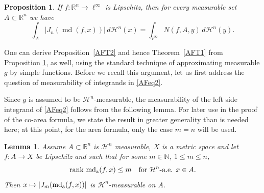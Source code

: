 \documentclass[12pt,leqno]{amsart}
\newtheorem{lemma}[theorem]{Lemma}
\newtheorem{proposition}[theorem]{Proposition}
\theoremstyle{definition}
\newcommand{\bbbn}{\mathbb N}
\newcommand{\bbbr}{\mathbb R}
\def\H{{\mathcal H}}
\def\rank{{\rm rank\,}}
\def\md{\operatorname{md}}
\def\apmd{\operatorname{md_{\rm a}}}
\numberwithin{theorem}{section} \numberwithin{equation}{section}
\begin{document}
\begin{proposition}
\label{AFT3}
If $f:\bbbr^n\to \ell^\infty$ is Lipschitz, then for every measurable set
$A\subset \bbbr^n$ we have
\begin{equation}
\label{AFeq3}
\int_A |J_n(\md(f,x))|\, d\H^n(x)
=
\int_{\ell^\infty} N(f,A,y)\, d\H^n(y).
\end{equation}
\end{proposition}


One can derive Proposition~\ref{AFT2} and hence Theorem~\ref{AFT1} from Proposition \ref{AFT3}, as well, using the standard technique of approximating measurable $g$ by simple functions. Before we recall this argument, let us first address the question of measurability of integrands in \eqref{AFeq2}.

Since $g$ is assumed to be $\H^n$-measurable, the measurability of the left side integrand of \eqref{AFeq2} follows from the following lemma. For later use in the proof of the co-area formula, we state the result in greater generality than is needed here; at this point, for the area formula, only the case $m=n$ will be used.
\begin{lemma}\label{AFT4}
Assume $A\subset\bbbr^n$ is $\H^n$ measurable, $X$ is a metric space and let $f:A\to X$ be Lipschitz and such that for some $m\in\bbbn$, $1\leq m\leq n$,
$$
\rank \apmd(f,x)\leq m\quad \text{for $\H^n$-a.e. }x\in A.
$$
Then $x\mapsto |J_m(\apmd(f,x))|$ is $\H^n$-measurable on $A$.
\end{lemma}
\end{document}
